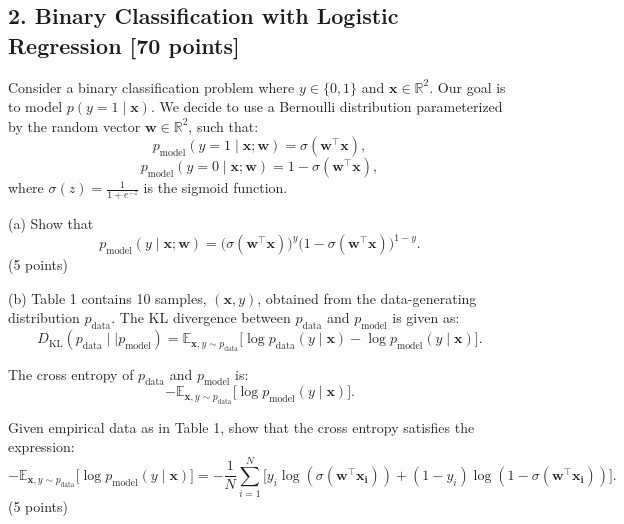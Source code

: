 \documentclass[a3paper,12pt]{article} %
\begin{document}
\vspace{30pt}
\subsection*{2. Binary Classification with Logistic Regression [70 points]} 

Consider a binary classification problem where $y \in \{0, 1\}$ and $\mathbf{x} \in \mathbb{R}^2$. Our goal is to model $p(y = 1 \mid \mathbf{x})$. We decide to use a Bernoulli distribution parameterized by the random vector $\mathbf{w} \in \mathbb{R}^2$, such that:
\[
p_{\text{model}}(y = 1 \mid \mathbf{x}; \mathbf{w}) = \sigma(\mathbf{w}^\top \mathbf{x}),
\]
\[
p_{\text{model}}(y = 0 \mid \mathbf{x}; \mathbf{w}) = 1 - \sigma(\mathbf{w}^\top \mathbf{x}),
\]
where $\sigma(z) = \frac{1}{1 + e^{-z}}$ is the sigmoid function.

(a) Show that
\[
p_{\text{model}}(y \mid \mathbf{x}; \mathbf{w}) = \big(\sigma(\mathbf{w}^\top \mathbf{x})\big)^y \big(1 - \sigma(\mathbf{w}^\top \mathbf{x})\big)^{1-y}.
\]
\hfill (5 points)

(b)
Table 1 contains 10 samples, $(\mathbf{x}, y)$, obtained from the data-generating distribution $p_{\text{data}}$. The KL divergence between $p_{\text{data}}$ and $p_{\text{model}}$ is given as:
\[
D_{\text{KL}}(p_{\text{data}} \mid\mid p_{\text{model}}) = \mathbb{E}_{\mathbf{x}, y \sim p_{\text{data}}} \big[\log p_{\text{data}}(y \mid \mathbf{x}) - \log p_{\text{model}}(y \mid \mathbf{x})\big].
\]

The cross entropy of $p_{\text{data}}$ and $p_{\text{model}}$ is:
\[
-\mathbb{E}_{\mathbf{x}, y \sim p_{\text{data}}} \big[\log p_{\text{model}}(y \mid \mathbf{x})\big].
\]

Given empirical data as in Table 1, show that the cross entropy satisfies the expression:
\[
-\mathbb{E}_{\mathbf{x}, y \sim p_{\text{data}}} \big[\log p_{\text{model}}(y \mid \mathbf{x})\big] = -\frac{1}{N} \sum^N_{i=1} \big[y_i \log(\sigma(\mathbf{w}^\top \mathbf{x_i})) + (1-y_i) \log(1-\sigma(\mathbf{w}^\top \mathbf{x_i}))\big].
\]
\hfill (5 points)
\end{document}
